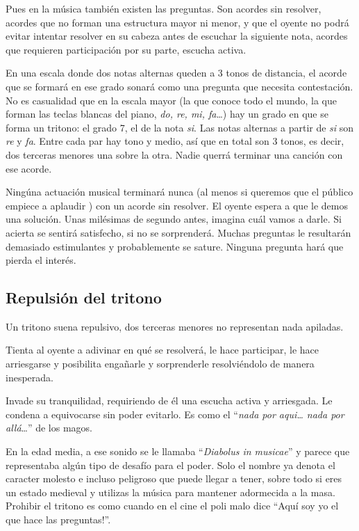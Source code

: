 \documentclass[]{article}
\begin{document}
Pues en la música también existen las preguntas. Son acordes sin resolver, acordes que no forman una estructura mayor ni menor, y que el oyente no podrá evitar intentar resolver en su cabeza antes de escuchar la siguiente nota, acordes que requieren participación por su parte, escucha activa.

En una escala donde dos notas alternas queden a 3 tonos de distancia, el acorde que se formará en ese grado sonará como una pregunta que necesita contestación. No es casualidad que en la escala mayor (la que conoce todo el mundo, la que forman las teclas blancas del piano, \emph{do, re,   mi, fa}\ldots) hay un grado en que se forma un tritono: el grado 7, el de la nota \emph{si}. Las notas alternas a partir de \emph{si} son \emph{re} y \emph{fa}. Entre cada par hay tono y medio, así que en total son 3 tonos, es decir, dos terceras menores una sobre la otra. Nadie querrá terminar una canción con ese acorde.

Ningúna actuación musical terminará nunca (al menos si queremos que el público empiece a aplaudir ) con un acorde sin resolver. El oyente espera a que le demos una solución. Unas milésimas de segundo antes, imagina cuál vamos a darle. Si acierta se sentirá satisfecho, si no se sorprenderá. Muchas preguntas le resultarán demasiado estimulantes y probablemente se sature. Ninguna pregunta hará que pierda el interés.

\subsection{Repulsión del tritono}

Un tritono suena repulsivo, dos terceras menores no representan nada apiladas.

Tienta al oyente a adivinar en qué se resolverá, le hace participar, le hace arriesgarse y posibilita engañarle y sorprenderle resolviéndolo de manera inesperada.

Invade su tranquilidad, requiriendo de él una escucha activa y arriesgada. Le condena a equivocarse sin poder evitarlo. Es como el ``\emph{nada por aqui\ldots{}   nada por allá}\ldots{}'' de los magos.

En la edad media, a ese sonido se le llamaba ``\emph{Diabolus in musicae}'' y parece que representaba algún tipo de desafío para el poder. Solo el nombre ya denota el caracter molesto e incluso peligroso que puede llegar a tener, sobre todo si eres un estado medieval y utilizas la música para mantener adormecida a la masa. Prohibir el tritono es como cuando en el cine el poli malo dice ``Aquí soy yo el que hace las preguntas!''.
\end{document}

